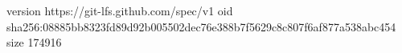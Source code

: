 version https://git-lfs.github.com/spec/v1
oid sha256:08885bb8323fd89d92b005502dec76e388b7f5629c8c807f6af877a538abc454
size 174916
